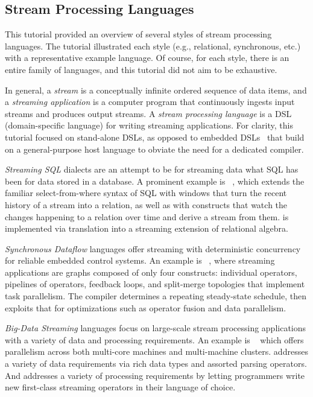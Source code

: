 \subsection{Stream Processing Languages}\label{sec:tut_lang}

This tutorial provided an overview of several styles of stream processing
languages. The tutorial illustrated each style (e.g., relational,
synchronous, etc.) with a representative example language. Of course,
for each style, there is an entire family of languages, and this
tutorial did not aim to be exhaustive.

In general, a \emph{stream} is a conceptually infinite ordered
sequence of data items, and a \emph{streaming application} is a
computer program that continuously ingests input streams and produces
output streams.  A \emph{stream processing language} is a DSL
(domain-specific language) for writing streaming applications.  For
clarity, this tutorial focused on stand-alone DSLs, as opposed to
embedded DSLs~\cite{hudak_1998} that build on a general-purpose host
language to obviate the need for a dedicated compiler.

\emph{Streaming SQL} dialects are an attempt to be for streaming data
what SQL has been for data stored in a database. A prominent example
is ~\cite{arasu_babu_widom_2006}, which extends the familiar
select-from-where syntax of SQL with windows that turn the recent
history of a stream into a relation, as well as with constructs that
watch the changes happening to a relation over time and derive a
stream from them.  is implemented via translation into a streaming
extension of relational algebra.

\emph{Synchronous Dataflow} languages offer streaming with
deterministic concurrency for reliable embedded control systems. An
example is ~\cite{thies_et_al_2002}, where streaming
applications are graphs composed of only four constructs: individual
operators, pipe\-lines of operators, feedback loops, and split-merge
topologies that implement task parallelism. The  compiler
determines a repeating steady-state schedule, then exploits that for
optimizations such as operator fusion and data parallelism.

\emph{Big-Data Streaming} languages focus on large-scale stream
processing applications with a variety of data and processing
requirements. An example is ~\cite{hirzel_schneider_gedik_2017} which offers parallelism across both multi-core machines and
multi-machine clusters.  addresses a variety of data requirements
via rich data types and assorted parsing operators. And  addresses
a variety of processing requirements by letting programmers write new
first-class streaming operators in their language of choice.

